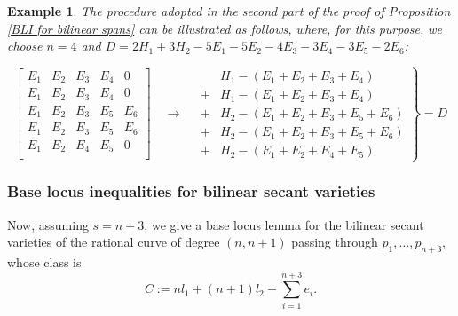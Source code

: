 \documentclass[a4paper,11pt]{article}
\newtheorem{example}[theorem]{Example}
\begin{document}
\begin{example}\label{example-procedure-CT}
 The procedure adopted in the second part of the proof of Proposition \ref{BLI for bilinear spans} can be illustrated as follows, where, for this purpose, we choose $n=4$ and $D=2H_1+3H_2-5E_1-5E_2-4E_3-3E_4-3E_5-2E_6$:

$$
\left[
\begin{array}{l|l|l|l||l}
E_1&E_2&E_3&E_4&0\\
E_1&E_2&E_3&E_4&0\\
\hline
E_1&E_2&E_3&E_5&E_6\\
E_1&E_2&E_3&E_5&E_6\\
E_1&E_2&E_4&E_5&0\\
\end{array}
\right]\quad \rightarrow \quad 
\left. \begin{array}{ll}
&H_1-(E_1+E_2+E_3+E_4)\\
+&H_1-(E_1+E_2+E_3+E_4)\\
+&H_2-(E_1+E_2+E_3+E_5+E_6)\\
+&H_2-(E_1+E_2+E_3+E_5+E_6)\\
+&H_2-(E_1+E_2+E_4+E_5)
\end{array}\right\}
 = D
$$
\end{example}

\subsubsection{Base locus inequalities for bilinear secant varieties}
Now, assuming $s=n+3$, we give a base locus lemma for the bilinear secant varieties of the rational curve of degree $(n,n+1)$ passing through $p_1,\dots,p_{n+3}$, whose class is 
$$C:=nl_1+(n+1)l_2-\sum_{i=1}^{n+3}e_i.
$$
\end{document}
